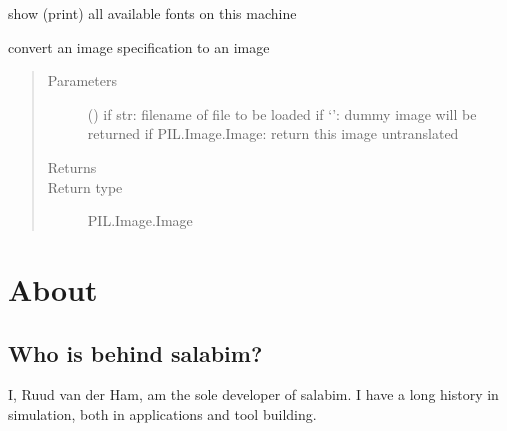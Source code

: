 \documentclass[letterpaper,10pt,english]{sphinxmanual}
\begin{document}

\begin{fulllineitems}
\label{\detokenize{Reference:salabim.show_fonts}}
show (print) all available fonts on this machine

\end{fulllineitems}


\begin{fulllineitems}
\label{\detokenize{Reference:salabim.spec_to_image}}
convert an image specification to an image
\begin{quote}\begin{description}
\item[{Parameters}] \leavevmode
{} () \textendash{} if str: filename of file to be loaded 
if ‘’: dummy image will be returned 
if PIL.Image.Image: return this image untranslated

\item[{Returns}] \leavevmode
{}

\item[{Return type}] \leavevmode
PIL.Image.Image

\end{description}\end{quote}

\end{fulllineitems}



\chapter{About}
\label{\detokenize{About:about}}\label{\detokenize{About::doc}}

\section{Who is behind salabim?}
\label{\detokenize{About:who-is-behind-salabim}}
I, Ruud van der Ham, am the sole developer of salabim. I have a long history in simulation, both in
applications and tool building.
\end{document}

